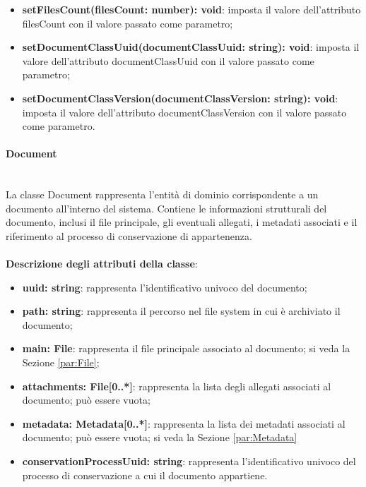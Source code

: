 \documentclass[a4paper,12pt]{article}
\begin{document}
{\begin{itemize}
                    \item \textbf{setFilesCount(filesCount: number): void}: imposta il valore dell'attributo filesCount con il valore passato come parametro;
                    \item \textbf{setDocumentClassUuid(documentClassUuid: string): void}: imposta il valore dell'attributo documentClassUuid con il valore passato come parametro;
                    \item \textbf{setDocumentClassVersion(documentClassVersion: string): void}: imposta il valore dell'attributo documentClassVersion con il valore passato come parametro.
                \end{itemize}

                \paragraph{Document}\label{par:Document}\mbox{}\\
                La classe Document rappresenta l'entità di dominio corrispondente a un documento all'interno del sistema. Contiene le informazioni strutturali del documento, inclusi il file principale, gli eventuali allegati, i metadati associati e il riferimento al processo di conservazione di appartenenza.\\
                \\
                \textbf{Descrizione degli attributi della classe}:
                \begin{itemize}
                    \item \textbf{uuid: string}: rappresenta l'identificativo univoco del documento;
                    \item \textbf{path: string}: rappresenta il percorso nel file system in cui è archiviato il documento;
                    \item \textbf{main: File}: rappresenta il file principale associato al documento; si veda la Sezione \ref{par:File};
                    \item \textbf{attachments: File[0..*]}: rappresenta la lista degli allegati associati al documento; può essere vuota;
                    \item \textbf{metadata: Metadata[0..*]}: rappresenta la lista dei metadati associati al documento; può essere vuota; si veda la Sezione \ref{par:Metadata}
                    \item \textbf{conservationProcessUuid: string}: rappresenta l'identificativo univoco del processo di conservazione a cui il documento appartiene.
                \end{itemize}
 
}
\end{document}
